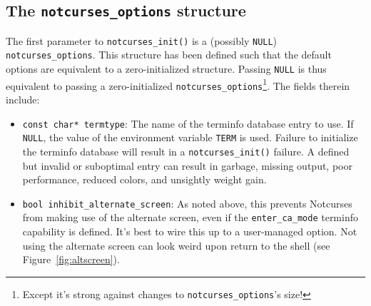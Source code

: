 \documentclass[letterpaper,10pt]{article}
\newenvironment{denseitemize}{
  \begin{itemize}
      \setlength{\itemsep}{0pt}
}{
  \end{itemize}
}
\begin{document}
\subsection{The \texttt{notcurses\_options} structure}
The first parameter to \texttt{notcurses\_init()} is a (possibly \texttt{NULL})
\texttt{notcurses\_options}. This structure has been defined such that the
default options are equivalent to a zero-initialized structure. Passing \texttt{NULL}
is thus equivalent to passing a zero-initialized \texttt{notcurses\_options}\footnote{Except
it's strong against changes to \texttt{notcurses\_options}'s size!}.
The fields therein include:
\begin{denseitemize}
\item{\texttt{const char* termtype}: The name of the terminfo database entry to
    use. If \texttt{NULL}, the value of the environment variable \texttt{TERM}
    is used. Failure to initialize the terminfo database will result in a
    \texttt{notcurses\_init()} failure.} A defined but invalid or suboptimal
    entry can result in garbage, missing output, poor performance, reduced
    colors, and unsightly weight gain.
\item{\texttt{bool inhibit\_alternate\_screen}: As noted above, this prevents
    Notcurses from making use of the alternate screen, even if the \texttt{enter\_ca\_mode}
    terminfo capability is defined. It's best to wire this up to a user-managed
    option. Not using the alternate screen can look weird upon return to the
    shell (see Figure~\ref{fig:altscreen}).

}
\end{denseitemize}
\end{document}
